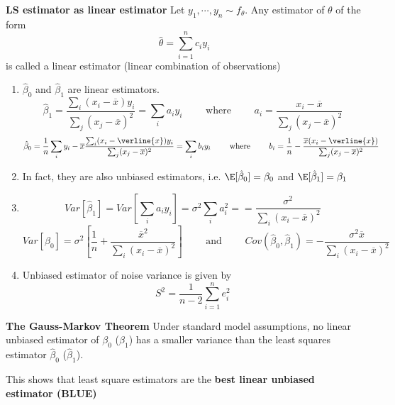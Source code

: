 \documentclass[11pt]{article}
\begin{document}
\begin{defn*}
  \textbf{LS estimator as linear estimator} Let $y_1, \cdots, y_n\sim f_{\theta}$. Any estimator of $\theta$ of the form
  \[
    \hat{\theta} = \sum_{i=1}^n c_i y_i
  \]
  is called a linear estimator (linear combination of observations)

  \begin{enumerate}
    \item $\hat{\beta}_0$ and $\hat{\beta}_1$ are linear estimators.
    \[
      \hat{\beta}_1 = \frac{\sum_i (x_i - \overline{x})y_i}{\sum_j (x_j - \overline{x})^2} = \sum_i a_i y_i \quad\quad\text{ where }\quad\quad a_i = \frac{x_i - \overline{x}}{\sum_j (x_j - \overline{x})^2}
    \]
    \[
      \hat{\beta}_0 = \frac{1}{n} \sum_i y_i - \overline{x} \frac{\sum_i (x_i - \verline{x})y_i}{\sum_j (x_j - \overline{x})^2} = \sum_i b_i y_i \quad\quad \text{ where }\quad \quad b_i = \frac{1}{n} - \frac{ \overline{x}(x_i - \verline{x})}{\sum_j (x_j - \overline{x})^2}
    \]
    \item In fact, they are also unbiased estimators, i.e. $\E[\hat{\beta}_0] = \beta_0$ and $\E[\hat{\beta}_1] = \beta_1$
    \item
    \[
      Var[\hat{\beta}_1] = Var\left[\sum_i a_i y_i\right] = \sigma^2 \sum_i a_i^2 = = \frac{\sigma^2}{\sum_i (x_i - \overline{x} )^2}
    \]
    \[
      Var[\hat{\beta}_0] = \sigma^2 \left[ \frac{1}{n} + \frac{\overline{x}^2}{\sum_i (x_i - \overline{x})^2} \right]
      \quad \quad \text{ and }\quad \quad
      Cov(\hat{\beta}_0, \hat{\beta}_1) = -\frac{\sigma^2 \overline{x}}{ \sum_i (x_i - \overline{x})^2}
    \]
    \item Unbiased estimator of noise variance is given by
    \[
      S^2 = \frac{1}{n - 2} \sum_{i=1}^n e_i^2
    \]
  \end{enumerate}
\end{defn*}



\begin{defn*}
  \textbf{The Gauss-Markov Theorem} Under standard model assumptions, no linear unbiased estimator of $\beta_0$ ($\beta_1$) has a smaller variance than the least squares estimator $\hat{\beta}_0$ ($\hat{\beta}_1$).
  \begin{rem}
    This shows that least square estimators are the \textbf{best linear unbiased estimator (BLUE)}
  \end{rem}
\end{defn*}
\end{document}
